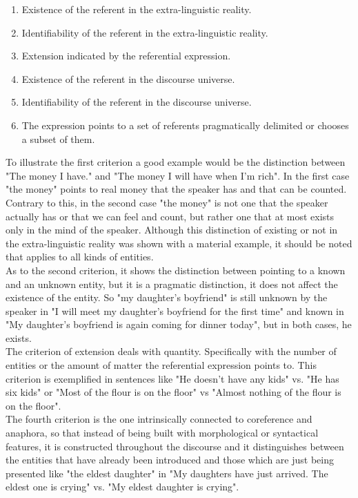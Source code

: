 \begin{enumerate}
  \item Existence of the referent in the extra-linguistic reality.
  \item Identifiability of the referent in the extra-linguistic reality.
  \item Extension indicated by the referential expression.
  \item Existence of the referent in the discourse universe.
  \item Identifiability of the referent in the discourse universe.
  \item The expression points to a set of referents pragmatically delimited or chooses a subset of them.
\end{enumerate}

To illustrate the first criterion a good example would be the distinction between "The money I have." and "The money I will have when I'm rich". In the first case "the money" points to real money that the speaker has and that can be counted. Contrary to this, in the second case "the money" is not one that the speaker actually has or that we can feel and count, but rather one that at most exists only in the mind of the speaker. Although this distinction of existing or not in the extra-linguistic reality was shown with a material example, it should be noted that applies to all kinds of entities.\\ 

As to the second criterion, it shows the distinction between pointing to a known and an unknown entity, but it is a pragmatic distinction, it does not affect the existence of the entity. So "my daughter's boyfriend" is still unknown by the speaker in "I will meet my daughter's boyfriend for the first time" and known in "My daughter's boyfriend is again coming for dinner today", but in both cases, he exists.\\

The criterion of extension deals with quantity. Specifically with the number of entities or the amount of matter the referential expression points to. This criterion is exemplified in sentences like "He doesn't have any kids" vs. "He has six kids" or "Most of the flour is on the floor" vs "Almost nothing of the flour is on the floor".\\

The fourth criterion is the one intrinsically connected to coreference and anaphora, so that instead of being built with morphological or syntactical features, it is constructed throughout the discourse and it distinguishes between the entities that have already been introduced and those which are just being presented like "the eldest daughter" in "My daughters have just arrived. The eldest one is crying" vs. "My eldest daughter is crying".\\


